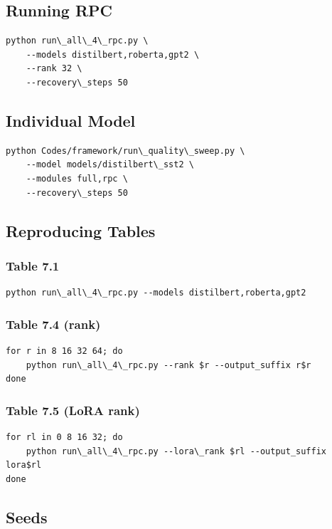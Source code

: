 \subsection{Running RPC}

\begin{lstlisting}
python run\_all\_4\_rpc.py \
    --models distilbert,roberta,gpt2 \
    --rank 32 \
    --recovery\_steps 50
\end{lstlisting}

\subsection{Individual Model}

\begin{lstlisting}
python Codes/framework/run\_quality\_sweep.py \
    --model models/distilbert\_sst2 \
    --modules full,rpc \
    --recovery\_steps 50
\end{lstlisting}

\subsection{Reproducing Tables}

\subsubsection{Table 7.1}
\begin{lstlisting}
python run\_all\_4\_rpc.py --models distilbert,roberta,gpt2
\end{lstlisting}

\subsubsection{Table 7.4 (rank)}
\begin{lstlisting}
for r in 8 16 32 64; do
    python run\_all\_4\_rpc.py --rank $r --output_suffix r$r
done
\end{lstlisting}

\subsubsection{Table 7.5 (LoRA rank)}
\begin{lstlisting}
for rl in 0 8 16 32; do
    python run\_all\_4\_rpc.py --lora\_rank $rl --output_suffix lora$rl
done
\end{lstlisting}

\subsection{Seeds}

